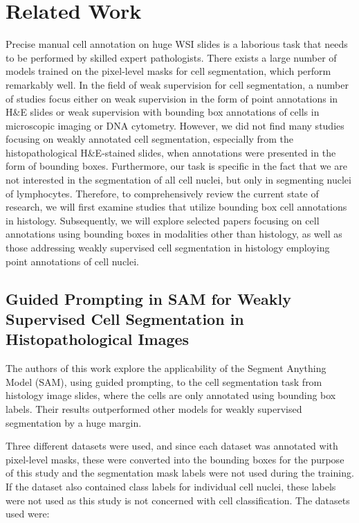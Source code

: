 \chapter{Related Work}
\label{chapter:related}

Precise manual cell annotation on huge WSI slides is a laborious task that needs to be performed by skilled expert pathologists. There exists a large number of models trained on the pixel-level masks for cell segmentation, which perform remarkably well. In the field of weak supervision for cell segmentation, a number of studies focus either on weak supervision in the form of point annotations in H\&E slides or weak supervision with bounding box annotations of cells in microscopic imaging or DNA cytometry. However, we did not find many studies focusing on weakly annotated cell segmentation, especially from the histopathological H\&E-stained slides, when annotations were presented in the form of bounding boxes. Furthermore, our task is specific in the fact that we are not interested in the segmentation of all cell nuclei, but only in segmenting nuclei of lymphocytes. Therefore, to comprehensively review the current state of research, we will first examine studies that utilize bounding box cell annotations in histology. Subsequently, we will explore selected papers focusing on cell annotations using bounding boxes in modalities other than histology, as well as those addressing weakly supervised cell segmentation in histology employing point annotations of cell nuclei.


\section{Guided Prompting in SAM for Weakly Supervised Cell Segmentation in Histopathological Images \cite{Tyagi2023}}
\label{section:related-1}

The authors of this work explore the applicability of the Segment Anything Model (SAM), using guided prompting, to the cell segmentation task from histology image slides, where the cells are only annotated using bounding box labels. Their results outperformed other models for weakly supervised segmentation by a huge margin.

Three different datasets were used, and since each dataset was annotated with pixel-level masks, these were converted into the bounding boxes for the purpose of this study and the segmentation mask labels were not used during the training. If the dataset also contained class labels for individual cell nuclei, these labels were not used as this study is not concerned with cell classification. The datasets used were: 

